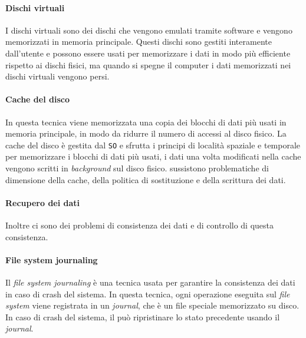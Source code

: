     \paragraph{Dischi virtuali} I dischi virtuali sono dei dischi che vengono emulati tramite software e vengono memorizzati in memoria principale. Questi dischi sono gestiti interamente dall'utente e possono essere usati per memorizzare i dati in modo più efficiente rispetto ai dischi fisici, ma quando si spegne il computer i dati memorizzati nei dischi virtuali vengono persi. 
    \paragraph{Cache del disco} In questa tecnica viene memorizzata una copia dei blocchi di dati più usati in memoria principale, in modo da ridurre il numero di accessi al disco fisico. La cache del disco è gestita dal \texttt{SO} e sfrutta i principi di località spaziale e temporale per memorizzare i blocchi di dati più usati, i dati una volta modificati nella cache vengono scritti in \textit{background} sul disco fisico. sussistono problematiche di dimensione della cache, della politica di sostituzione e della scrittura dei dati. 
    \paragraph{Recupero dei dati} Inoltre ci sono dei problemi di consistenza dei dati e di controllo di questa consistenza.
    \paragraph{File system journaling} Il \textit{file system journaling} è una tecnica usata per garantire la consistenza dei dati in caso di crash del sistema. In questa tecnica, ogni operazione eseguita sul \textit{file system} viene registrata in un \textit{journal}, che è un file speciale memorizzato su disco. In caso di crash del sistema, il  può ripristinare lo stato precedente usando il \textit{journal}.